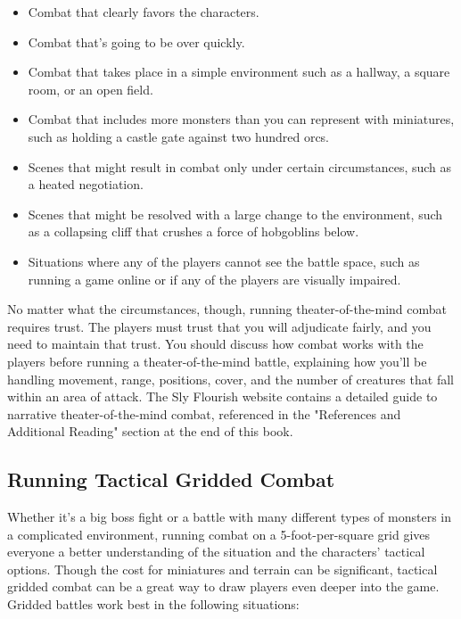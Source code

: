 \documentclass[10pt,a4paper,twoside,bg=print,twocolumn,openany,nodeprecatedcode]{dndbook}
\begin{document}
\begin{itemize}
\item Combat that clearly favors the characters.
\item Combat that's going to be over quickly.
\item Combat that takes place in a simple environment such as a hallway, a square room, or an open field.
\item Combat that includes more monsters than you can represent with miniatures, such as holding a castle gate against two hundred orcs.
\item Scenes that might result in combat only under certain circumstances, such as a heated negotiation.
\item Scenes that might be resolved with a large change to the environment, such as a collapsing cliff that crushes a force of hobgoblins below.
\item Situations where any of the players cannot see the battle space, such as running a game online or if any of the players are visually impaired.
\end{itemize}

No matter what the circumstances, though, running theater-of-the-mind combat requires trust. The players must trust that you will adjudicate fairly, and you need to maintain that trust. You should discuss how combat works with the players before running a theater-of-the-mind battle, explaining how you'll be handling movement, range, positions, cover, and the number of creatures that fall within an area of attack. The Sly Flourish website contains a detailed guide to narrative theater-of-the-mind combat, referenced in the "References and Additional Reading" section at the end of this book.
\subsection{Running Tactical Gridded Combat}
Whether it's a big boss fight or a battle with many different types of monsters in a complicated environment, running combat on a 5-foot-per-square grid gives everyone a better understanding of the situation and the characters' tactical options. Though the cost for miniatures and terrain can be significant, tactical gridded combat can be a great way to draw players even deeper into the game.
Gridded battles work best in the following situations:
\end{document}

